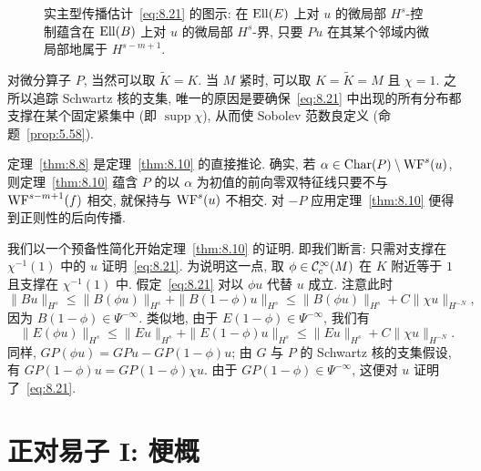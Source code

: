 \begin{figure}[htbp]
\centering
\drawFigEightTwo
\caption{实主型传播估计~\eqref{eq:8.21} 的图示: 在 $\operatorname{Ell}(E)$ 上对 $u$ 的微局部 $H^s$-控制蕴含在 $\operatorname{Ell}(B)$ 上对 $u$ 的微局部 $H^s$-界, 只要 $Pu$ 在其某个邻域内微局部地属于 $H^{s-m+1}$.}
\label{fig:8.2}
\end{figure}

\begin{remark}[支集与切断函数]\label{rem:8.12}
对微分算子 $P$, 当然可以取 $\tilde{K} = K$. 当 $M$ 紧时, 可以取 $K = \tilde{K} = M$ 且 $\chi = 1$. 之所以追踪 Schwartz 核的支集, 唯一的原因是要确保~\eqref{eq:8.21} 中出现的所有分布都支撑在某个固定紧集中 (即 $\operatorname{supp}\chi$), 从而使 Sobolev 范数良定义 (命题~\ref{prop:5.58}).
\end{remark}

定理~\ref{thm:8.8} 是定理~\ref{thm:8.10} 的直接推论. 确实, 若 $\alpha \in \operatorname{Char}(P) \setminus \operatorname{WF}^s(u)$, 则定理~\ref{thm:8.10} 蕴含 $P$ 的以 $\alpha$ 为初值的前向零双特征线只要不与 $\operatorname{WF}^{s-m+1}(f)$ 相交, 就保持与 $\operatorname{WF}^s(u)$ 不相交. 对 $-P$ 应用定理~\ref{thm:8.10} 便得到正则性的后向传播.

我们以一个预备性简化开始定理~\ref{thm:8.10} 的证明. 即我们断言: 只需对支撑在 $\chi^{-1}(1)$ 中的 $u$ 证明~\eqref{eq:8.21}. 为说明这一点, 取 $\phi \in \mathcal{C}_{\mathrm{c}}^\infty(M)$ 在 $K$ 附近等于 $1$ 且支撑在 $\chi^{-1}(1)$ 中. 假定~\eqref{eq:8.21} 对以 $\phi u$ 代替 $u$ 成立. 注意此时
\begin{equation}\label{eq:8.22}
    \| B u \|_{H^s} \le \| B(\phi u) \|_{H^s} + \| B(1 - \phi)u \|_{H^s} \le \| B(\phi u) \|_{H^s} + C \| \chi u \|_{H^{-N}},
\end{equation}
因为 $B(1 - \phi) \in \Psi^{-\infty}$. 类似地, 由于 $E(1 - \phi) \in \Psi^{-\infty}$, 我们有
\begin{equation}\label{eq:8.23}
    \| E(\phi u) \|_{H^s} \le \| E u \|_{H^s} + \| E(1 - \phi)u \|_{H^s} \le \| E u \|_{H^s} + C \| \chi u \|_{H^{-N}}.
\end{equation}
同样, $GP(\phi u) = GPu - GP(1 - \phi)u$; 由 $G$ 与 $P$ 的 Schwartz 核的支集假设, 有 $GP(1 - \phi)u = GP(1 - \phi)\chi u$. 由于 $GP(1 - \phi) \in \Psi^{-\infty}$, 这便对 $u$ 证明了~\eqref{eq:8.21}.



\section{正对易子 I: 梗概}\label{sec:8.2}

